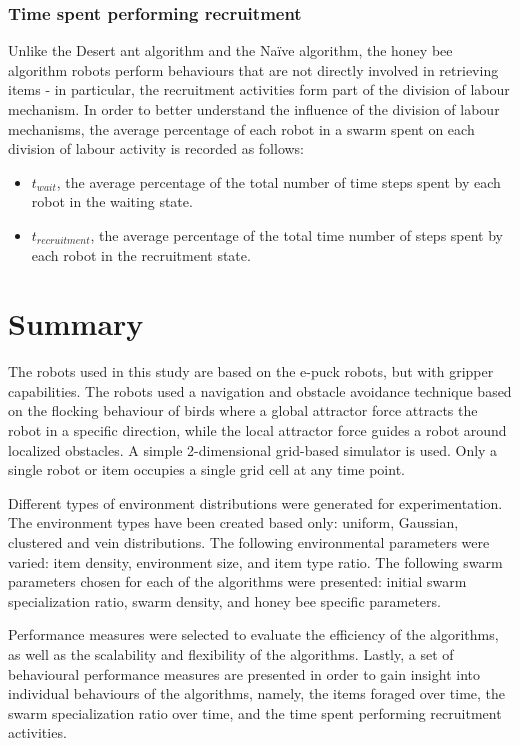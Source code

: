 \subsubsection{Time spent performing recruitment}
Unlike the Desert ant algorithm and the Na\"ive algorithm, the honey bee algorithm robots perform behaviours that are not directly involved in retrieving items - in particular, the recruitment activities form part of the division of labour mechanism. In order to better understand the influence of the division of labour mechanisms, the average percentage of each robot in a swarm spent on each division of labour activity is recorded as follows:

\begin{itemize}
\item $t_{wait}$, the average percentage of the total number of time steps spent by each robot in the waiting state.
\item $t_{recruitment}$, the average percentage of the total time number of steps spent by each robot in the recruitment state.
\end{itemize}



\section{Summary}
\label{third:summary}
The robots used in this study are based on the e-puck robots, but with gripper capabilities. The robots used a navigation and obstacle avoidance technique based on the flocking behaviour of birds where a global attractor force attracts the robot in a specific direction, while the local attractor force guides a robot around localized obstacles. A simple 2-dimensional grid-based simulator is used. Only a single robot or item occupies a single grid cell at any time point.

Different types of environment distributions were generated for experimentation. The environment types have been created based only: uniform, Gaussian, clustered and vein distributions. The following environmental parameters were varied: item density, environment size, and item type ratio. The following swarm parameters chosen for each of the algorithms were presented: initial swarm specialization ratio, swarm density, and honey bee specific parameters.

Performance measures were selected to evaluate the efficiency of the algorithms, as well as the scalability and flexibility of the algorithms. Lastly, a set of behavioural performance measures are presented in order to gain insight into individual behaviours of the algorithms, namely, the items foraged over time, the swarm specialization ratio over time, and the time spent performing recruitment activities.

